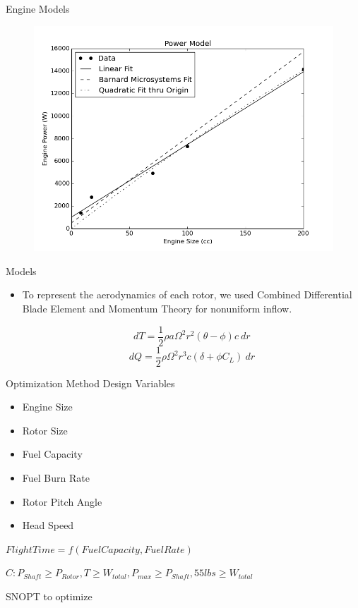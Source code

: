 \documentclass{beamer}
\begin{document}
\begin{frame}{Engine Models}	
	\begin{figure}
		\begin{center}
			\includegraphics[width=.70\textwidth]{../max_power.png}
			\label{fig:eng_power}
		\end{center}
	\end{figure}
	
\end{frame}

\begin{frame}{Models}
	\begin{itemize}
		\item{To represent the aerodynamics of each rotor, we used Combined Differential Blade Element and Momentum Theory for nonuniform inflow.}
		\begin{center}
		$$ dT = \frac{1}{2} \rho a \Omega^2 r^2 (\theta - \phi) c \  dr $$
		$$ dQ = \frac{1}{2} \rho \Omega^2 r^3 c (\delta + \phi C_L) \ dr $$
		\end{center}
	\end{itemize}

\end{frame}

\begin{frame}{Optimization Method}
	Design Variables
	\begin{itemize}
		\item{Engine Size}
		\item{Rotor Size}
		\item{Fuel Capacity}
		\item{Fuel Burn Rate}
		\item{Rotor Pitch Angle}
		\item{Head Speed}
	\end{itemize}
	
	$Flight Time = f(Fuel Capacity, Fuel Rate)$
	
	$C: P_{Shaft} \geq P_{Rotor}, T \geq W_{total}, P_{max} \geq P_{Shaft}, 55lbs \geq W_{total} $ 
	
	SNOPT to optimize
\end{frame}
\end{document}
